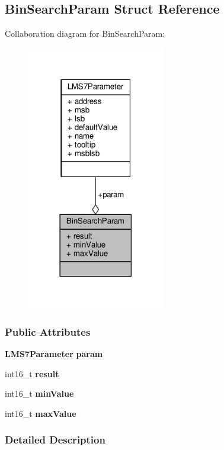 \subsection{Bin\+Search\+Param Struct Reference}
\label{structBinSearchParam}


Collaboration diagram for Bin\+Search\+Param\+:
\nopagebreak
\begin{figure}[H]
\begin{center}
\leavevmode
\includegraphics[width=170pt]{d4/d39/structBinSearchParam__coll__graph}
\end{center}
\end{figure}
\subsubsection*{Public Attributes}
\begin{DoxyCompactItemize}
\item 
{\bf L\+M\+S7\+Parameter} {\bf param}
\item 
int16\+\_\+t {\bf result}
\item 
int16\+\_\+t {\bf min\+Value}
\item 
int16\+\_\+t {\bf max\+Value}
\end{DoxyCompactItemize}


\subsubsection{Detailed Description}


